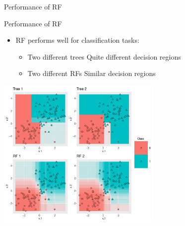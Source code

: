 \documentclass[11pt,compress,t,notes=noshow, xcolor=table]{beamer}
\begin{document}
\begin{vbframe}{Performance of RF}
\end{vbframe}

\begin{vbframe}{Performance of RF}
\begin{itemize}
    \begin{itemize}
        \item \small RF performs well for classification tasks:
        \begin{itemize}
            \item \small Two different trees \textrightarrow Quite different decision regions
            \item \small Two different RFs \textrightarrow Similar decision regions
        \end{itemize}
    \end{itemize}
\begin{center}
 \includegraphics[width = 0.6\textwidth]{figure/nutshell_classif_combined_1.pdf}
\end{center}
\end{itemize}



\end{vbframe}
\end{document}

